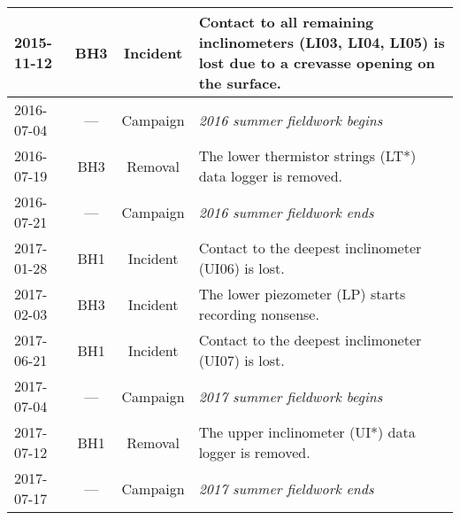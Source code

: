\documentclass[utf8]{article}
\begin{document}
\begin{table}
{\begin{tabular}{lccp{95mm}}
        2015-11-12 & BH3  & Incident & Contact to all remaining inclinometers
                                       (LI03, LI04, LI05) is lost due to
                                       a crevasse opening on the surface. \\
        \hline
        2016-07-04 & ---  & Campaign & \emph{2016 summer fieldwork begins} \\
        2016-07-19 & BH3  & Removal  & The lower thermistor strings (LT*) data
                                       logger is removed. \\
        2016-07-21 & ---  & Campaign & \emph{2016 summer fieldwork ends} \\
        \hline
        2017-01-28 & BH1  & Incident & Contact to the deepest inclinometer
                                       (UI06) is lost. \\
        2017-02-03 & BH3  & Incident & The lower piezometer (LP) starts
                                       recording nonsense. \\
        2017-06-21 & BH1  & Incident & Contact to the deepest inclimoneter
                                       (UI07) is lost. \\
        \hline
        2017-07-04 & ---  & Campaign & \emph{2017 summer fieldwork begins} \\
        2017-07-12 & BH1  & Removal  & The upper inclinometer (UI*) data logger
                                       is removed. \\
        2017-07-17 & ---  & Campaign & \emph{2017 summer fieldwork ends} \\
        \hline
      \end{tabular}}
    \end{table}
\end{document}

